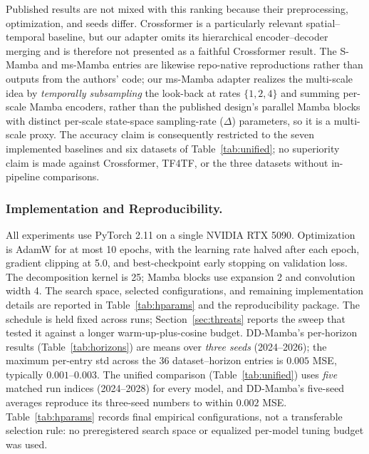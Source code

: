 \documentclass[review,12pt]{elsarticle}
\newcommand{\model}{DD-Mamba}
\begin{document}
Published results are not mixed with this ranking because their
preprocessing, optimization, and seeds differ. Crossformer
\cite{crossformer} is a particularly relevant spatial--temporal baseline,
but our adapter omits its hierarchical encoder--decoder merging and is
therefore not presented as a faithful Crossformer result. The S-Mamba and
ms-Mamba entries are likewise repo-native reproductions rather than outputs
from the authors' code; our ms-Mamba adapter realizes the multi-scale idea by
\emph{temporally subsampling} the look-back at rates $\{1,2,4\}$ and summing
per-scale Mamba encoders, rather than the published design's parallel Mamba
blocks with distinct per-scale state-space sampling-rate ($\Delta$)
parameters, so it is a multi-scale proxy. The accuracy claim is consequently
restricted to the seven implemented baselines and six datasets of
Table~\ref{tab:unified}; no superiority claim is made against Crossformer,
TF4TF, or the three datasets without in-pipeline comparisons.

\subsubsection{Implementation and Reproducibility.}
\label{sec:repro}
All experiments use PyTorch 2.11 on a single NVIDIA RTX 5090.
Optimization is AdamW for at most 10 epochs, with the learning rate halved
after each epoch, gradient clipping at 5.0, and best-checkpoint early
stopping on validation loss. The decomposition kernel is 25; Mamba blocks
use expansion 2 and convolution width 4. The search space, selected
configurations, and remaining implementation details are reported in
Table~\ref{tab:hparams} and the reproducibility package. The schedule is
held fixed across runs; Section~\ref{sec:threats} reports the sweep that
tested it against a longer warm-up-plus-cosine budget. \model{}'s
per-horizon results (Table~\ref{tab:horizons}) are means over \emph{three
seeds} (2024--2026); the maximum per-entry std across the 36
dataset--horizon entries is $0.005$ MSE, typically $0.001$--$0.003$. The
unified comparison (Table~\ref{tab:unified}) uses \emph{five} matched run
indices (2024--2028) for every model, and \model{}'s five-seed averages
reproduce its three-seed numbers to within $0.002$ MSE.
Table~\ref{tab:hparams} records final empirical configurations, not a
transferable selection rule: no preregistered search space or equalized
per-model tuning budget was used.
\end{document}
